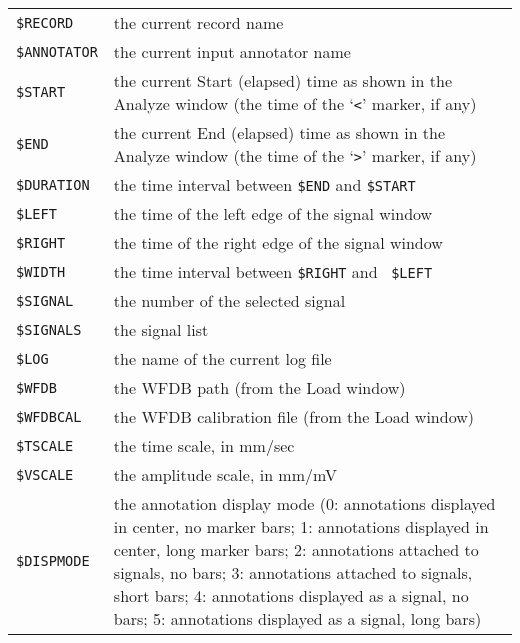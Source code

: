 \documentclass[twoside]{book}
\begin{document}
\begin{tabular*}{\textwidth}{l p{3.5 in}}
{\tt \$RECORD} & { the current record name } \\

{\tt \$ANNOTATOR} & { the current input annotator name } \\

{\tt \$START} &
{ the current {\sf Start (elapsed)} time as shown in the {\sf Analyze} window
(the time of the `{\tt <}' marker, if any) } \\

{\tt \$END} &
{ the current {\sf End (elapsed)} time as shown in the {\sf Analyze}
window (the time of the `{\tt >}' marker, if any) } \\

{\tt \$DURATION} &
{ the time interval between {\tt \$END} and {\tt \$START} } \\

{\tt \$LEFT} & { the time of the left edge of the signal window } \\

{\tt \$RIGHT} & { the time of the right edge of the signal window } \\

{\tt \$WIDTH} & { the time interval between {\tt \$RIGHT} and {\tt
\$LEFT} } \\

{\tt \$SIGNAL} & { the number of the selected signal } \\

{\tt \$SIGNALS} & { the signal list } \\

{\tt \$LOG} & { the name of the current log file } \\

{\tt \$WFDB} & { the WFDB path (from the {\sf Load} window) } \\

{\tt \$WFDBCAL} &
{ the WFDB calibration file (from the {\sf Load} window) } \\

{\tt \$TSCALE} & { the time scale, in mm/sec } \\

{\tt \$VSCALE} & { the amplitude scale, in mm/mV } \\

{\tt \$DISPMODE} &
{ the annotation display mode (0: annotations displayed in center,
no marker bars; 1: annotations displayed in center, long marker bars;
2: annotations attached to signals, no bars; 3: annotations attached
to signals, short bars; 4: annotations displayed as a signal, no bars;
5: annotations displayed as a signal, long bars) } \\
\end{tabular*}
\end{document}
